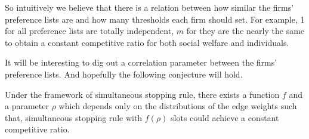 So intuitively we believe that there is a relation between how similar
the firms' preference lists are and how many thresholds each 
firm should set. For example, 1 for all preference lists are totally 
independent, $m$ for
they are the nearly the same to obtain a constant competitive ratio for both
social welfare and individuals.

It will be interesting to dig out a correlation parameter between the firms'
preference lists. And hopefully the following conjecture will hold.

\begin{conjecture}
    Under the framework of simultaneous stopping rule, there exists 
    a function $f$ and a parameter $\rho$ which depends only on 
    the distributions of the edge weights such that, 
    simultaneous stopping rule with $f(\rho)$ slots could achieve a
    constant competitive ratio.
\end{conjecture}

